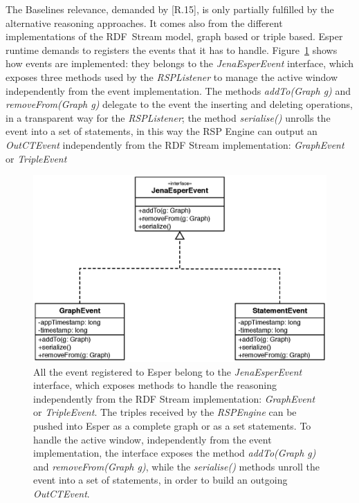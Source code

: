 The Baselines relevance, demanded by [R.15], is only partially fulfilled by the alternative reasoning approaches. It comes also from the different implementations of the RDF~Stream model, graph based or triple based. Esper runtime demands to registers the events that it has to handle. Figure~\ref{fig:uml_baselines_events} shows how events are implemented: they belongs to the \textit{JenaEsperEvent} interface, which exposes three methods used by the \textit{RSPListener} to manage the active window independently from the event implementation. The methods \textit{addTo(Graph g)} and \textit{removeFrom(Graph g)} delegate to the event the inserting and deleting operations, in a transparent way for the \textit{RSPListener}; the method \textit{serialise()} unrolls the event into a set of statements, in this way the RSP Engine can output an \textit{OutCTEvent} independently from the RDF Stream implementation: \textit{GraphEvent} or \textit{TripleEvent}

\begin{figure}[t!]
  \centering
	\includegraphics[width=0.8\linewidth]{images/uml_baselines_events}
	\caption[Esper-level Graph based and Triple based - UML Schema]{ All the event registered to Esper belong to the \textit{JenaEsperEvent} interface, which exposes methods to handle the reasoning independently from the RDF Stream implementation:  \textit{GraphEvent} or \textit{TripleEvent}. The triples received by the \textit{RSPEngine} can be pushed into Esper as a complete graph or as a set statements. To handle the active window, independently from the event implementation, the interface exposes the method \textit{addTo(Graph g)} and \textit{removeFrom(Graph g)}, while the \textit{serialise()} methods unroll the event into a set of statements, in order to build an outgoing \textit{OutCTEvent}.}
  	\label{fig:uml_baselines_events}
\end{figure}

